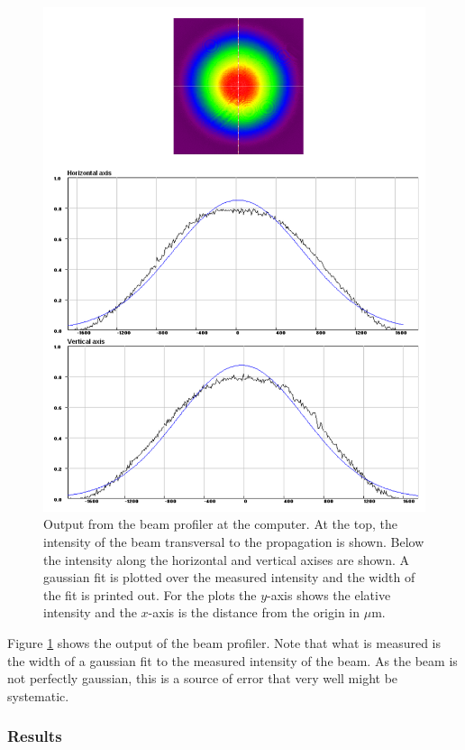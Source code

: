 \documentclass[a4paper, 11pt, notitlepage, english]{article}
\begin{document}
\begin{figure}[ht!]
\centering
\includegraphics[width=\textwidth]{beampro.pdf}	
\caption{Output from the beam profiler at the computer. At the top, the intensity of the beam transversal to the propagation is shown. Below the intensity along the horizontal and vertical axises are shown. A gaussian fit is plotted over the measured intensity and the width of the fit is printed out. For the plots the $y$-axis shows the elative intensity and the $x$-axis is the distance from the origin in $\mu$m. \label{fig:beam_pro}}
\end{figure}

\clearpage

Figure \ref{fig:beam_pro} shows the output of the beam profiler. Note that what is measured is the width of a gaussian fit to the measured intensity of the beam. As the beam is not perfectly gaussian, this is a source of error that very well might be systematic.

\subsubsection{Results}
\end{document}
